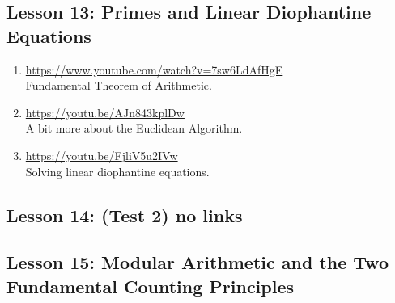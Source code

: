 \documentclass[11pt]{amsart}
\begin{document}
\subsection{Lesson 13: Primes and Linear Diophantine Equations}
\begin{enumerate}

\item \url{https://www.youtube.com/watch?v=7sw6LdAfHgE}\\
Fundamental Theorem of Arithmetic.\\[5pt]



\item \url{https://youtu.be/AJn843kplDw}\\
A bit more about the Euclidean Algorithm.\\[5pt]



\item \url{https://youtu.be/FjliV5u2IVw}\\
Solving linear diophantine equations.\\[5pt]

\end{enumerate}


\subsection{Lesson 14: (Test 2) no links}

\subsection{Lesson 15: Modular Arithmetic and the Two Fundamental Counting Principles}
\end{document}
